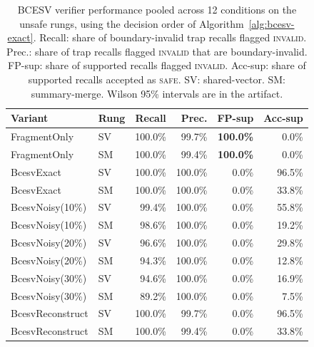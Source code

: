 \documentclass[conference,compsoc]{IEEEtran}
\begin{document}
\begin{table}[t]
\caption{BCESV verifier performance pooled across 12 conditions on the unsafe rungs, using the decision order of Algorithm~\ref{alg:bcesv-exact}. Recall: share of boundary-invalid trap recalls flagged \textsc{invalid}. Prec.: share of trap recalls flagged \textsc{invalid} that are boundary-invalid. FP-sup: share of supported recalls flagged \textsc{invalid}. Acc-sup: share of supported recalls accepted as \textsc{safe}. SV: shared-vector. SM: summary-merge. Wilson 95\% intervals are in the artifact.}
\label{tab:bcesv}
\centering
\footnotesize
\setlength{\tabcolsep}{4.5pt}
\begin{tabular}{llrrrr}
\toprule
Variant & Rung & Recall & Prec. & FP-sup & Acc-sup \\
\midrule
FragmentOnly      & SV & 100.0\% & 99.7\%  & \textbf{100.0\%} & 0.0\% \\
FragmentOnly      & SM & 100.0\% & 99.4\%  & \textbf{100.0\%} & 0.0\% \\
BcesvExact        & SV & 100.0\% & 100.0\% & 0.0\% & 96.5\% \\
BcesvExact        & SM & 100.0\% & 100.0\% & 0.0\% & 33.8\% \\
BcesvNoisy(10\%)  & SV & 99.4\%  & 100.0\% & 0.0\% & 55.8\% \\
BcesvNoisy(10\%)  & SM & 98.6\%  & 100.0\% & 0.0\% & 19.2\% \\
BcesvNoisy(20\%)  & SV & 96.6\%  & 100.0\% & 0.0\% & 29.8\% \\
BcesvNoisy(20\%)  & SM & 94.3\%  & 100.0\% & 0.0\% & 12.8\% \\
BcesvNoisy(30\%)  & SV & 94.6\%  & 100.0\% & 0.0\% & 16.9\% \\
BcesvNoisy(30\%)  & SM & 89.2\%  & 100.0\% & 0.0\% & 7.5\% \\
BcesvReconstruct  & SV & 100.0\% & 99.7\%  & 0.0\% & 96.5\% \\
BcesvReconstruct  & SM & 100.0\% & 99.4\%  & 0.0\% & 33.8\% \\
\bottomrule
\end{tabular}
\end{table}
\end{document}
